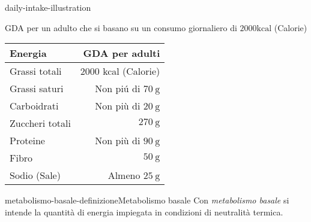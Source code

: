 \documentclass[preview]{standalone}
\begin{document}

\begin{snippet}{daily-intake-illustration}
    \begin{center}
    GDA per un adulto che si basano su un consumo giornaliero di $2000 \mathrm{kcal}$ (Calorie)
    \begin{tabular}{|l|r|}
    \hline Energia & GDA per adulti \\
    \hline Grassi totali & 2000 kcal (Calorie) \\
    \hline Grassi saturi & Non piú di $70 \mathrm{~g}$ \\
    \hline Carboidrati & Non più di $20 \mathrm{~g}$ \\
    \hline Zuccheri totali & $270 \mathrm{~g}$ \\
    \hline Proteine & Non più di $90 \mathrm{~g}$ \\
    \hline Fibro & $50 \mathrm{~g}$ \\
    \hline Sodio (Sale) & Almeno $25 \mathrm{~g}$ \\
    \hline
    \end{tabular}
    \end{center}
    \phantom{}
\end{snippet}


\begin{snippetdefinition}{metabolismo-basale-definizione}{Metabolismo basale}
    Con \textit{metabolismo basale} si intende la quantità di energia impiegata in condizioni di neutralità termica.
\end{snippetdefinition}
\end{document}
